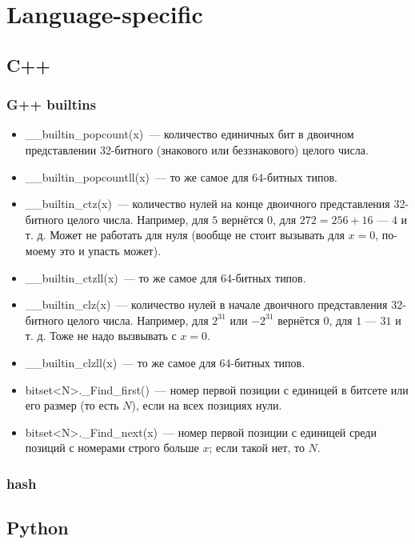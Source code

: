 \section{Language-specific}

\subsection{C++}

\subsubsection{G++ builtins}

\begin{itemize}
\item  \_\_builtin\_popcount(x)~--- количество единичных бит в двоичном представлении 32-битного (знакового или беззнакового) целого числа.
\item \_\_builtin\_popcountll(x)~--- то же самое для 64-битных типов.
\item \_\_builtin\_ctz(x)~--- количество нулей на конце двоичного представления 32-битного целого числа. Например, для $5$ вернётся $0$, для $272 = 256 + 16$ --- $4$ и т. д. Может не работать для нуля (вообще не стоит вызывать для $x = 0$, по-моему это и упасть может).
\item \_\_builtin\_ctzll(x)~--- то же самое для 64-битных типов.
\item \_\_builtin\_clz(x)~--- количество нулей в начале двоичного представления 32-битного целого числа. Например, для $2^{31}$ или $-2^{31}$ вернётся
$0$, для $1$ --- $31$ и т. д. Тоже не надо вызвывать с $x = 0$.
\item \_\_builtin\_clzll(x)~--- то же самое для 64-битных типов.

\item bitset<N>.\_Find\_first()~--- номер первой позиции с единицей в битсете или его размер
(то есть $N$), если на всех позициях нули.
\item bitset<N>.\_Find\_next(x)~--- номер первой позиции с единицей среди позиций с номерами строго больше $x$; если такой нет, то $N$.
\end{itemize}

\subsubsection{hash}



\subsection{Python}


